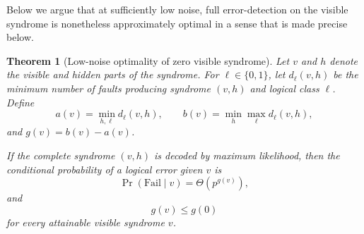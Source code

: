 \documentclass[
    reprint,
    amsmath,amssymb,
    nofootinbib,
    superscriptaddress,
    aps,
    noeprint,
    longbibliography,
    prl
]{revtex4-2}
\theoremstyle{plain}
\newtheorem{theorem}{Theorem}[section]
\begin{document}
Below we argue that at sufficiently low noise, full error-detection on the visible syndrome is
nonetheless approximately optimal in a sense that is made precise below.

\begin{theorem}[Low-noise optimality of zero visible syndrome]

    Let \(v\) and \(h\) denote the visible and hidden parts of the syndrome. For \(\ell\in\{0,1\}\),
    let \(d_\ell(v,h)\) be the minimum number of faults producing syndrome \((v,h)\) and logical
    class \(\ell\). Define
    \begin{equation}
        a(v)=\min_{h,\ell} d_\ell(v,h),
        \qquad
        b(v)=\min_h \max_{\ell} d_\ell(v,h),
    \end{equation}
    and \(g(v)=b(v)-a(v)\).

    If the complete syndrome \((v,h)\) is decoded by maximum likelihood, then the conditional
    probability of a logical error given $v$ is
    \begin{equation}
        \Pr(\mathrm{Fail}\mid v)
        =
        \Theta\!\left(p^{g(v)}\right),
    \end{equation}
    and
    \begin{equation}
        g(v)\leq g(0)
    \end{equation}
    for every attainable visible syndrome \(v\).

\end{theorem}
\end{document}
